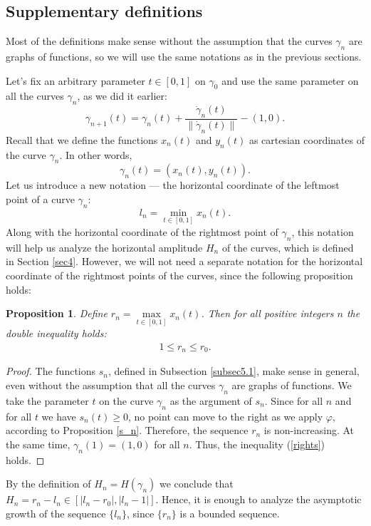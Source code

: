 \documentclass{article}
\newtheorem{prop}[theorem]{Proposition}
\theoremstyle{definition}
\newcommand{\lt}{\left}
\newcommand{\rt}{\right}
\newcommand{\Le}{\leqslant}
\newcommand{\Ge}{\geqslant}
\newcommand{\vphi}{\varphi}
\newcommand{\lims}{\limits}
\begin{document}
    \subsection{Supplementary definitions}
    Most of the definitions make sense without the assumption that the curves $\gamma_n$ are graphs of functions, so we will use the same notations as in the previous sections.
    
    Let's fix an arbitrary parameter $t\in[0, 1]$ on $\gamma_0$ and use the same parameter on all the curves $\gamma_n$, as we did it earlier:
    $$
    \gamma_{n+1}(t) = \gamma_n(t) + \frac{\dot{\gamma}_n(t)}{\|\dot{\gamma}_n(t)\|} - (1, 0).
    $$
    Recall that we define the functions $x_n(t)$ and $y_n(t)$ as cartesian coordinates of the curve $\gamma_n$. In other words, 
    $$
    \gamma_n(t) = (x_n(t), y_n(t)).
    $$
    Let us introduce a new notation --- the horizontal coordinate of the leftmost point of a curve $\gamma_n$:
    $$
    l_n = \min\lims_{t\in[0, 1]}x_n(t).
    $$
    Along with the horizontal coordinate of the rightmost point of $\gamma_n$, this notation will help us analyze the horizontal amplitude $H_n$ of the curves, which is defined in Section \ref{sec4}. However, we will not need a separate notation for the horizontal coordinate of the rightmost points of the curves, since the following proposition holds:
    \begin{prop}\label{rightbounds}
        Define $r_n = \max\lims_{t\in[0, 1]}x_n(t)$. Then for all positive integers $n$ the double inequality holds:
        \begin{align}
        \label{rights}
        1 \Le r_n\Le r_0.
        \end{align}
    \end{prop}
    \begin{proof}
        The functions $s_n$, defined in Subsection \ref{subsec5.1}, make sense in general, even without the assumption that all the curves $\gamma_n$ are graphs of functions. We take the parameter $t$ on the curve $\gamma_n$ as the argument of $s_n$. Since for all $n$ and for all $t$ we have $s_n(t) \Ge 0$, no point can move to the right as we apply $\vphi$, according to Proposition \ref{s_n}. Therefore, the sequence $r_n$ is non-increasing. At the same time, $\gamma_n(1) = (1, 0)$ for all $n$. Thus, the inequality (\ref{rights}) holds.
    \end{proof}
    By the definition of $H_n = H(\gamma_n)$ we conclude that $H_n = r_n - l_n \in \lt[|l_n - r_0|, |l_n - 1|\rt]$. Hence, it is enough to analyze the asymptotic growth of the sequence $\{l_n\}$, since $\{r_n\}$ is a bounded sequence.
\end{document}
